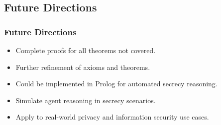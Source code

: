 \documentclass[aspectratio=169]{beamer}
\begin{document}
\subsection{Future Directions}
\begin{frame}
\frametitle{Future Directions}
\begin{itemize}
    \Large
    \item Complete proofs for all theorems not covered.
    \item Further refinement of axioms and theorems.
    \item Could be implemented in Prolog for automated secrecy reasoning.
    \item Simulate agent reasoning in secrecy scenarios.
    \item Apply to real-world privacy and information security use cases.
\end{itemize}
\end{frame}


\end{document}
